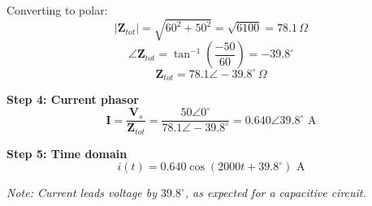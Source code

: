 \documentclass[10pt]{article}
\begin{document}
\begin{enumerate}
{        Converting to polar:
        \[
        |\mathbf{Z}_{tot}| = \sqrt{60^2 + 50^2} = \sqrt{6100} = 78.1\,\Omega
        \]
        \[
        \angle\mathbf{Z}_{tot} = \tan^{-1}\left(\frac{-50}{60}\right) = -39.8^\circ
        \]
        \[
        \mathbf{Z}_{tot} = 78.1\angle -39.8^\circ\,\Omega
        \]
        
        \textbf{Step 4: Current phasor}
        \[
        \mathbf{I} = \frac{\mathbf{V}_s}{\mathbf{Z}_{tot}} = \frac{50\angle 0^\circ}{78.1\angle -39.8^\circ} = 0.640\angle 39.8^\circ\text{ A}
        \]
        
        \textbf{Step 5: Time domain}
        \[
        \boxed{i(t) = 0.640\cos(2000t + 39.8^\circ)\text{ A}}
        \]
        
        \textit{Note: Current leads voltage by $39.8^\circ$, as expected for a capacitive circuit.}
        
    }{}
    \end{enumerate}
\end{document}
